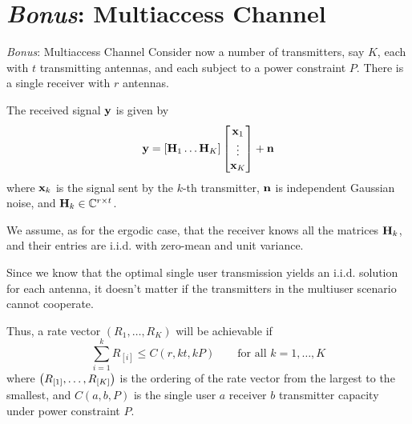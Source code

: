 \section{\protect\textit{Bonus}: Multiaccess Channel}
\begin{frame}[allowframebreaks]{\textit{Bonus}: Multiaccess Channel}
Consider now a number of transmitters, say $K$, each with $t$ transmitting antennas, and each subject to a power constraint $P$. There is a single receiver with $r$ antennas.

\medskip
The received signal $\vb{y}$ is given by
$$\vb{y} = \qty[\vb{H}_1 \ldots \vb{H}_K]
\begin{bmatrix}
\vb{x}_1 \\ 
\vdots \\ 
\vb{x}_K
\end{bmatrix} 
+\vb{n}$$
where $\vb{x}_k$ is the signal sent by the $k$-th transmitter, $\vb{n}$ is independent Gaussian noise, and $\vb{H}_k\in \mathbb{C}^{r\times t}$.

\framebreak

We assume, as for the ergodic case, that the receiver knows all the matrices $\vb{H}_k$, and their entries are i.i.d. \cscg{} with zero-mean and unit variance.

\medskip
Since we know that the optimal single user transmission yields an i.i.d. solution for each antenna, it doesn't matter if the transmitters in the multiuser scenario cannot cooperate.

\medskip
Thus, a rate vector $(R_1,\ldots,R_K)$ will be achievable if
$$\sum_{i=1}^{k} R_{[i]} \leq C(r,kt,kP) \qquad \text{for all } k=1,\ldots,K$$
where $\qty(R_{[1]},\ldots,R_{[K]})$ is the ordering of the rate vector from the largest to the smallest, and $C(a, b, P)$ is the single user
$a$ receiver $b$ transmitter capacity under power constraint $P$.

\end{frame}